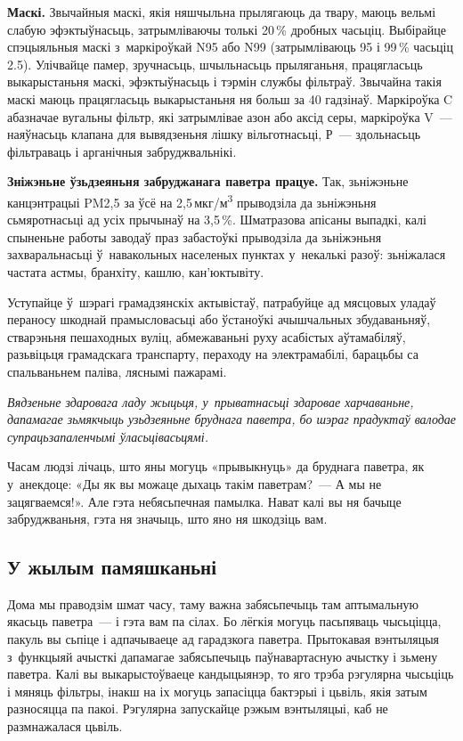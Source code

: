 \textbf{Маскі.} Звычайныя маскі, якія няшчыльна прылягаюць да твару, маюць вельмі слабую эфэктыўнасьць, затрымліваючы толькі 20\,\% дробных часьціц. Выбірайце спэцыяльныя маскі з~маркіроўкай N95 або N99 (затрымліваюць 95 і 99\,\% часьціц 2.5). Улічвайце памер, зручнасьць, шчыльнасьць прыляганьня, працягласьць выкарыстаньня маскі, эфэктыўнасьць і тэрмін службы фільтраў. Звычайна такія маскі маюць працягласьць выкарыстаньня ня больш за 40 гадзінаў. Маркіроўка C абазначае вугальны фільтр, які затрымлівае азон або аксід серы, маркіроўка V~--- наяўнасьць клапана для вывядзеньня лішку вільготнасьці, Р~--- здольнасьць фільтраваць і арганічныя забруджвальнікі.

\textbf{Зніжэньне ўзьдзеяньня забруджанага паветра працуе.} Так, зьніжэньне канцэнтрацыі PM2,5 за ўсё на 2,5\,мкг/м\textsuperscript{3} прыводзіла да зьніжэньня сьмяротнасьці ад усіх прычынаў на 3,5\,\%. Шматразова апісаны выпадкі, калі спыненьне работы заводаў праз забастоўкі прыводзіла да зьніжэньня захваральнасьці ў~навакольных населеных пунктах у~некалькі разоў: зьніжалася частата астмы, бранхіту, кашлю, кан'юктывіту.

Уступайце ў~шэрагі грамадзянскіх актывістаў, патрабуйце ад мясцовых уладаў пераносу шкоднай прамысловасьці або ўстаноўкі ачышчальных збудаваньняў, стварэньня пешаходных вуліц, абмежаваньні руху асабістых аўтамабіляў, разьвіцьця грамадскага транспарту, пераходу на электрамабілі, барацьбы са спальваньнем паліва, ляснымі пажарамі.

\emph{Вядзеньне здаровага ладу жыцьця, у~прыватнасьці здаровае харчаваньне, дапамагае зьмякчыць узьдзеяньне бруднага паветра, бо шэраг прадуктаў валодае супрацьзапаленчымі ўласьцівасьцямі.}

Часам людзі лічаць, што яны могуць «прывыкнуць» да бруднага паветра, як у~анекдоце: «Ды як вы можаце дыхаць такім паветрам?~--- А мы не зацягваемся!». Але гэта небясьпечная памылка. Нават калі вы ня бачыце забруджваньня, гэта ня значыць, што яно ня шкодзіць вам.

\subsection*{У жылым памяшканьні}

Дома мы праводзім шмат часу, таму важна забясьпечыць там аптымальную якасьць паветра~--- і гэта вам па сілах. Бо лёгкія могуць пасьпяваць чысьціцца, пакуль вы сьпіце і адпачываеце ад гарадзкога паветра. Прытокавая вэнтыляцыя з~функцыяй ачысткі дапамагае забясьпечыць паўнавартасную ачыстку і зьмену паветра. Калі вы выкарыстоўваеце кандыцыянэр, то яго трэба рэгулярна чысьціць і мяняць фільтры, інакш на іх могуць запасіцца бактэрыі і цьвіль, якія затым разносяцца па пакоі. Рэгулярна запускайце рэжым вэнтыляцыі, каб не размнажалася цьвіль.

